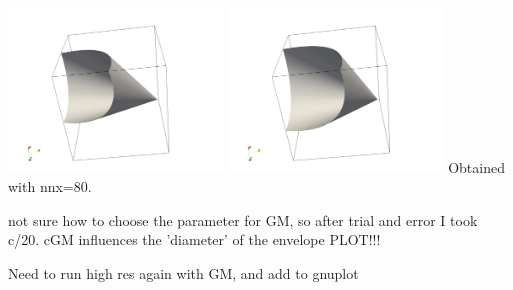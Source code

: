 \begin{center}
\includegraphics[width=5.7cm]{python_codes/fieldstone_159/images/DPm}
\includegraphics[width=5.7cm]{python_codes/fieldstone_159/images/DPc}
{\captionfont Obtained with nnx=80}.
\end{center}

not sure how to choose the parameter for GM, so after trial and error I took c/20.
cGM influences the 'diameter' of the envelope PLOT!!!


Need to run high res again with GM, and add to gnuplot


